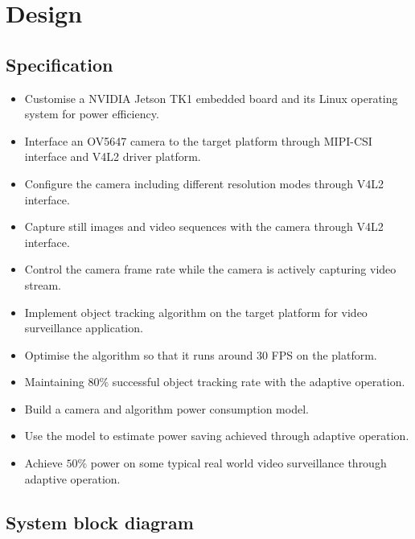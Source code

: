 \chapter{Design} \label{Chapter:Design}

\section{Specification}


\begin{itemize}
	\setlength\itemsep{0em}
	\item Customise a NVIDIA Jetson TK1 embedded board and its Linux operating system for power efficiency.
	\item Interface an OV5647 camera to the target platform through MIPI-CSI interface and V4L2 driver platform.
	\item Configure the camera including different resolution modes through V4L2 interface.
	\item Capture still images and video sequences with the camera through V4L2 interface.
	\item Control the camera frame rate while the camera is actively capturing video stream.
	\item Implement object tracking algorithm on the target platform for video surveillance application.
	\item Optimise the algorithm so that it runs around $30$ FPS on the platform.
	\item Maintaining $80\%$ successful object tracking rate with the adaptive operation.
	\item Build a camera and algorithm power consumption model.
	\item Use the model to estimate power saving achieved through adaptive operation.
	\item Achieve $50\%$ power  on some typical real world video surveillance  through adaptive operation.
\end{itemize}

\section{System block diagram}

